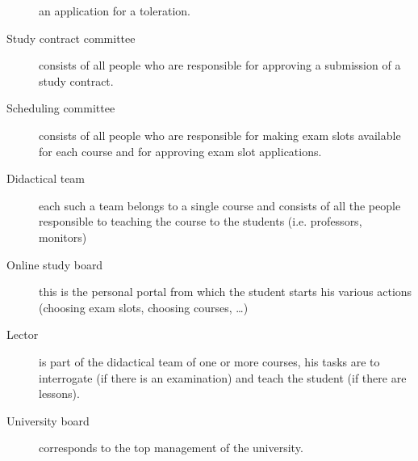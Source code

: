 \begin{description}
an application for a toleration.
\item[Study contract committee] consists of all people who are responsible for
approving a submission of a study contract.
\item[Scheduling committee] consists of all people who are responsible for making
exam slots available for each course and for approving exam slot applications.
\item[Didactical team] each such a team belongs to a single course and consists of all 
the people responsible to teaching the course to the students (i.e. professors, monitors) 
\item[Online study board] this is the personal portal from which the student starts his
various actions (choosing exam slots, choosing courses, \ldots)
\item[Lector] is part of the didactical team of one or more courses, his tasks
are to interrogate (if there is an examination) and teach the student (if there
are lessons).
\item[University board] corresponds to the top management of the university. 
\end{description}

